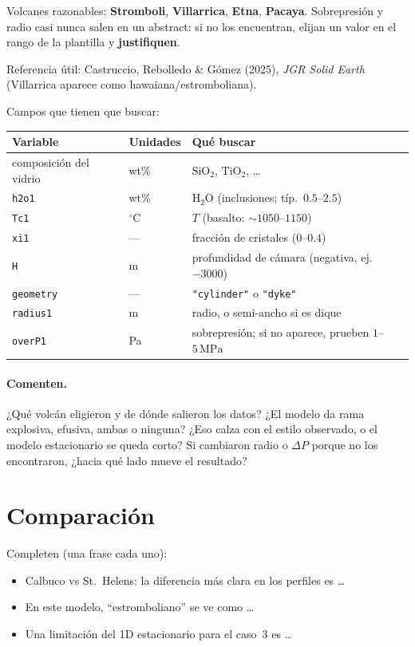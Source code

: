 \documentclass[11pt,a4paper]{article}
\begin{document}
Volcanes razonables: \textbf{Stromboli}, \textbf{Villarrica},
\textbf{Etna}, \textbf{Pacaya}.
Sobrepresión y radio casi nunca salen en un abstract: si no los encuentran,
elijan un valor en el rango de la plantilla y \textbf{justifiquen}.

Referencia útil:
Castruccio, Rebolledo \& Gómez (2025), \emph{JGR Solid Earth}
(Villarrica aparece como hawaiana/estromboliana).

Campos que tienen que buscar:

\begin{center}
\small
\begin{tabular}{@{}llp{}@{}}
\toprule
Variable & Unidades & Qué buscar \\
\midrule
composición del vidrio & wt\% & $\mathrm{SiO}_2$, $\mathrm{TiO}_2$, \ldots \\
\texttt{h2o1} & wt\% & $\mathrm{H}_2\mathrm{O}$ (inclusiones; típ.\ $0.5$--$2.5$) \\
\texttt{Tc1} & $^\circ\mathrm{C}$ & $T$ (basalto: $\sim 1050$--$1150$) \\
\texttt{xi1} & --- & fracción de cristales ($0$--$0.4$) \\
\texttt{H} & m & profundidad de cámara (negativa, ej.\ $-3000$) \\
\texttt{geometry} & --- & \texttt{"cylinder"} o \texttt{"dyke"} \\
\texttt{radius1} & m & radio, o semi-ancho si es dique \\
\texttt{overP1} & Pa & sobrepresión; si no aparece, prueben $1$--$5\,\mathrm{MPa}$ \\
\bottomrule
\end{tabular}
\end{center}

\paragraph{Comenten.}
¿Qué volcán eligieron y de dónde salieron los datos?
¿El modelo da rama explosiva, efusiva, ambas o ninguna?
¿Eso calza con el estilo observado, o el modelo estacionario se queda corto?
Si cambiaron radio o $\Delta P$ porque no los encontraron,
¿hacia qué lado mueve el resultado?

\section{Comparación}

Completen (una frase cada uno):
\begin{itemize}
  \item Calbuco vs St.\ Helens: la diferencia más clara en los perfiles es \ldots
  \item En este modelo, ``estromboliano'' se ve como \ldots
  \item Una limitación del 1D estacionario para el caso~3 es \ldots
\end{itemize}
\end{document}
